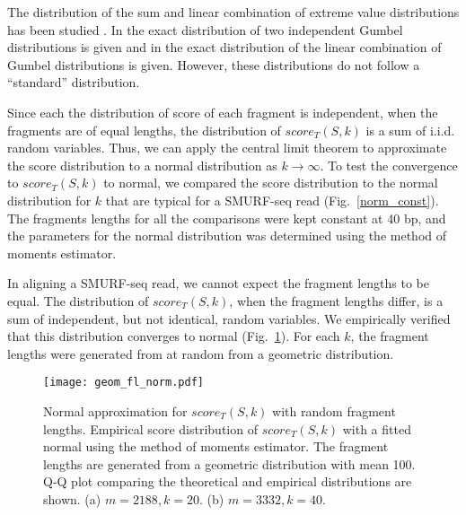 The distribution of the sum and linear combination of extreme value
distributions has been studied \citep{cetinkaya2001scalable,
marques2015distribution,loaiciga1999analysis,nadarajah2008exact}.  In
\citep{loaiciga1999analysis} the exact distribution of two independent
Gumbel distributions is given and in \citep{nadarajah2008exact} the exact
distribution of the linear combination of Gumbel distributions is given.
%
However, these distributions do not follow a ``standard'' distribution.

Since each the distribution of score of each fragment is independent,
when the fragments are of equal lengths, the distribution of
$score_T(S,k)$ is a sum of i.i.d. random variables. Thus, we can apply
the central limit theorem to approximate the score distribution to a
normal distribution as $k \to \infty$. To test the convergence to
$score_T(S,k)$ to normal, we compared the score distribution to the
normal distribution for $k$ that are typical for a SMURF-seq read
(Fig.~\ref{norm_const}). The fragments lengths for all the comparisons
were kept constant at 40 bp, and the parameters for the normal
distribution was determined using the method of moments estimator.

In aligning a SMURF-seq read, we cannot expect the fragment lengths to
be equal. The distribution of $score_T(S,k)$, when the fragment lengths
differ, is a sum of independent, but not identical, random variables. We
empirically verified that this distribution converges to normal
(Fig.~\ref{norm_geom}). For each $k$, the fragment lengths were
generated from at random from a geometric distribution.

\begin{figure}[t!]
\centering
\texttt{[image: geom\_fl\_norm.pdf]}
\caption[Normal approximation for $score_T(S,k)$ with random fragment
  lengths]{
  Normal approximation for $score_T(S,k)$ with random fragment lengths.
  Empirical score distribution of $score_T(S,k)$ with a fitted
  normal using the method of moments estimator. The fragment lengths are
  generated from a geometric distribution with mean 100. Q-Q plot comparing
  the theoretical and empirical distributions are shown.
  (a) $m=2188, k=20$.
  (b) $m=3332, k=40$.}
\label{norm_geom}
\end{figure}


